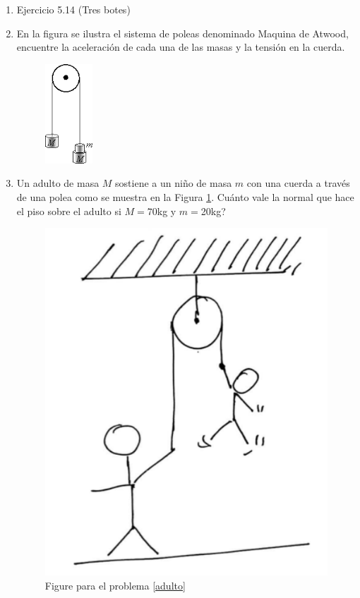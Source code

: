 \documentclass[letterpaper,10pt,onecolumn]{article}
\begin{document}
\begin{enumerate}
\item Ejercicio 5.14 (Tres botes) %

\item
En la figura se ilustra  el sistema de poleas denominado  Maquina de Atwood, encuentre la aceleración de cada una de las masas y la tensión en la cuerda. 
\begin{figure}[h]
\begin{center} 
\includegraphics[scale=0.80]{maquinadeatwood.png} 
\end{center} 
\end{figure}
  
\item \label{adulto}Un adulto de masa $M$ sostiene a un ni\~no de masa $m$ con una
  cuerda a trav\'es de una polea como se muestra en la
  Figura \ref{fig:adulto}. Cu\'anto vale la normal que hace el piso sobre el adulto si
  $M=70$kg y $m=$20kg?
\begin{figure}[h]
\begin{center} 
\includegraphics[scale=0.25]{adulto.png} 
\caption{\label{fig:adulto}Figure para el problema \ref{adulto}}
\end{center} 
\end{figure}




\end{enumerate}
\end{document}
